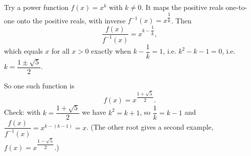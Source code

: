 Try a power function $f(x)=x^k$ with $k\ne0$. It maps the positive reals one-to-one onto the positive reals, with inverse $f^{-1}(x)=x^{\dfrac1k}$. Then
\[\dfrac{f(x)}{f^{-1}(x)}=x^{k-\dfrac1k},\]
which equals $x$ for all $x>0$ exactly when $k-\dfrac1k=1$, i.e. $k^2-k-1=0$, i.e. $k=\dfrac{1\pm\sqrt5}{2}$.

So one such function is
\[\boxed{f(x)=x^{\dfrac{1+\sqrt5}{2}}}.\]
Check: with $k=\dfrac{1+\sqrt5}{2}$ we have $k^2=k+1$, so $\dfrac1k=k-1$ and $\dfrac{f(x)}{f^{-1}(x)}=x^{k-(k-1)}=x$. (The other root gives a second example, $f(x)=x^{\dfrac{1-\sqrt5}{2}}$.)
